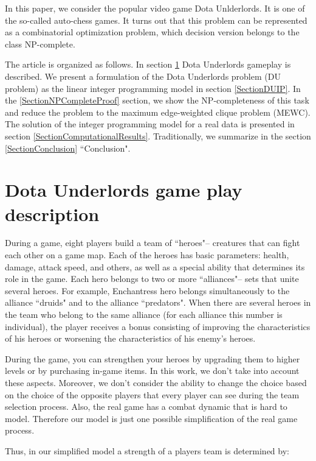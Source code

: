 \documentclass[smallextended]{svjour3}       %
\begin{document}
In this paper, we consider the popular video game Dota Unlderlords. It is one of the so-called auto-chess games. It turns out that this problem can be represented as a combinatorial optimization problem, which decision version  belongs to the class NP-complete.

The article is organized as follows. In section \ref{SectionDUDescription} Dota Underlords gameplay is described.
We present a formulation of the Dota Underlords problem (DU problem) as the linear integer programming model in section \ref{SectionDUIP}. In the \ref{SectionNPCompleteProof} section, we show the NP-completeness of this task and reduce the problem to the maximum edge-weighted clique problem (MEWC). The solution of the integer programming model for a real data is presented in section \ref{SectionComputationalResults}. Traditionally, we summarize in the section \ref{SectionConclusion} ``Conclusion".

\section{Dota Underlords game play description}
\label{SectionDUDescription}

During a game, eight players build a team of ``heroes"-- creatures that can fight each other on a game map. Each of the heroes has basic parameters: health, damage, attack speed, and others, as well as a special ability that determines its role in the game. Each hero belongs to two or more ``alliances"-- sets that unite several heroes. For example, Enchantress hero belongs simultaneously to the alliance ``druids" and to the alliance ``predators". When there are several heroes in the team who belong to the same alliance (for each alliance this number is individual), the player receives a bonus consisting of improving the characteristics of his heroes or worsening the characteristics of his enemy's heroes.

During the game, you can strengthen your heroes by upgrading them to higher levels or by purchasing in-game items. In this work, we don't take into account these aspects. Moreover, we don't consider the ability to change the choice based on the choice of the opposite players that every player can see during the team selection process. Also, the real game has a combat dynamic that is hard to model. Therefore our model is just one possible simplification of the real game process.

Thus, in our simplified model a strength of a players team is determined by:
\end{document}
